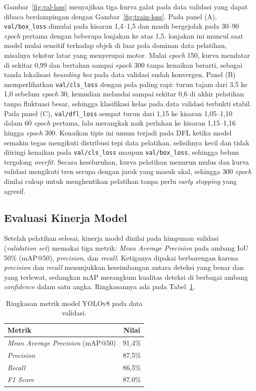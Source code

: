 Gambar~\ref{fig:val-loss} menyajikan tiga kurva galat pada data validasi yang dapat dibaca berdampingan dengan Gambar~\ref{fig:train-loss}. Pada panel (A), \texttt{val/box\_loss} dimulai pada kisaran 1,4--1,5 dan masih bergejolak pada 30--90 \textit{epoch} pertama dengan beberapa lonjakan ke atas 1,5. lonjakan ini muncul saat model mulai sensitif terhadap objek di luar pola dominan data pelatihan, misalnya tekstur latar yang menyerupai motor. Mulai \textit{epoch} 150, kurva mendatar di sekitar 0,99 dan bertahan sampai \textit{epoch} 300 tanpa kenaikan berarti, sebagai tanda lokalisasi \textit{bounding box} pada data validasi sudah konvergen. Panel (B) memperlihatkan \texttt{val/cls\_loss} dengan pola paling rapi: turun tajam dari 3,5 ke 1,0 sebelum \textit{epoch} 30, kemudian melandai sampai sekitar 0,6 di akhir pelatihan tanpa fluktuasi besar, sehingga klasifikasi kelas pada data validasi terbukti stabil. Pada panel (C), \texttt{val/dfl\_loss} sempat turun dari 1,15 ke kisaran 1,05--1,10 dalam 60 \textit{epoch} pertama, lalu merangkak naik perlahan ke kisaran 1,15--1,16 hingga \textit{epoch} 300. Kenaikan tipis ini umum terjadi pada DFL ketika model semakin tegas mengikuti distribusi tepi data pelatihan. selisihnya kecil dan tidak diiringi kenaikan pada \texttt{val/cls\_loss} maupun \texttt{val/box\_loss}, sehingga belum tergolong \textit{overfit}. Secara keseluruhan, kurva pelatihan menurun mulus dan kurva validasi mengikuti tren serupa dengan jarak yang masuk akal, sehingga 300 \textit{epoch} dinilai cukup untuk menghentikan pelatihan tanpa perlu \textit{early stopping} yang agresif.

\subsection{Evaluasi Kinerja Model}
\label{subsec:evaluasi-kinerja}

Setelah pelatihan selesai, kinerja model dinilai pada himpunan validasi (\textit{validation set}) memakai tiga metrik: \textit{Mean Average Precision} pada ambang IoU 50\% (mAP@50), \textit{precision}, dan \textit{recall}. Ketiganya dipakai berbarengan karena \textit{precision} dan \textit{recall} menunjukkan keseimbangan antara deteksi yang benar dan yang terlewat, sedangkan mAP merangkum kualitas deteksi di berbagai ambang \textit{confidence} dalam satu angka. Ringkasannya ada pada Tabel~\ref{tab:metrik-validasi}.

\begin{table}[htbp]
\centering
\caption{Ringkasan metrik model YOLOv8 pada data validasi.}
\label{tab:metrik-validasi}
\begin{tabular}{lc}
\toprule
\textbf{Metrik} & \textbf{Nilai} \\
\midrule
\textit{Mean Average Precision} (mAP@50) & 91,4\% \\
\textit{Precision}  & 87,5\% \\
\textit{Recall}     & 86,5\% \\
\textit{F1 Score}     & 87.0\% \\
\bottomrule
\end{tabular}
\end{table}


